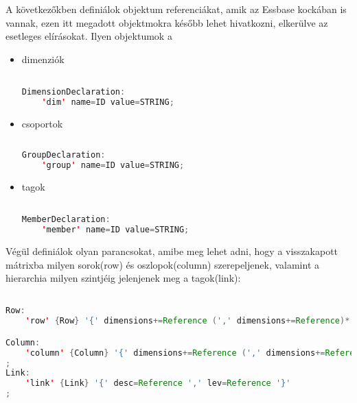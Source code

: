 A következőkben definiálok objektum referenciákat, amik az Essbase kockában is vannak, ezen itt megadott objektmokra később lehet hivatkozni, elkerülve az esetleges elírásokat. Ilyen objektumok a

\begin{itemize}
  \item dimenziók
\begin{lstlisting}[language=java,morekeywords={generate,dim,group,row,link,reportParameter,report,query},alsoletter={-},breaklines=true]

DimensionDeclaration:
	'dim' name=ID value=STRING;

\end{lstlisting}
  \item csoportok
\begin{lstlisting}[language=java,morekeywords={generate,dim,group,row,link,reportParameter,report,query},alsoletter={-},breaklines=true]
  
GroupDeclaration:
	'group' name=ID value=STRING;
\end{lstlisting}
  \item tagok
\begin{lstlisting}[language=java,morekeywords={generate,dim,group,row,link,reportParameter,report,query},alsoletter={-},breaklines=true]

MemberDeclaration:
	'member' name=ID value=STRING;

\end{lstlisting}

\end{itemize}
Végül definiálok olyan parancsokat, amibe meg lehet adni, hogy a visszakapott mátrixba milyen sorok(row) és oszlopok(column) szerepeljenek, valamint a hierarchia milyen szintjéig jelenjenek meg a tagok(link):
\begin{lstlisting}[language=java,morekeywords={generate,dim,group,row,link,reportParameter,report,query},alsoletter={-},breaklines=true]

Row:
	'row' {Row} '{' dimensions+=Reference (',' dimensions+=Reference)* '}';

Column:
	'column' {Column} '{' dimensions+=Reference (',' dimensions+=Reference)* '}'
; 	
Link:
	'link' {Link} '{' desc=Reference ',' lev=Reference '}'
; 	

\end{lstlisting}
% 

